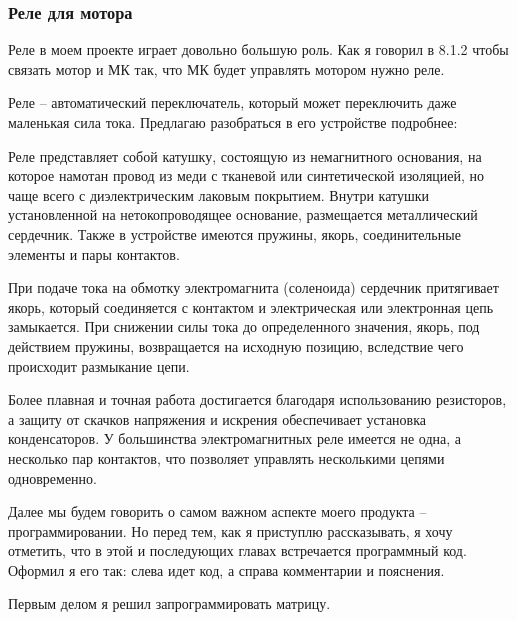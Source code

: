 \documentclass[a4paper, 12pt]{article}
\begin{document}

\subsubsection{Реле для мотора}

Реле в моем проекте играет довольно большую роль. Как я говорил в 8.1.2
чтобы связать мотор и МК так, что МК будет управлять мотором нужно реле.


Реле -- автоматический переключатель, который может переключить даже маленькая
сила тока. Предлагаю разобраться в его устройстве подробнее:


Реле представляет собой катушку, состоящую из немагнитного основания, на 
которое намотан провод из меди с тканевой или синтетической изоляцией, но чаще
всего с диэлектрическим лаковым покрытием. Внутри катушки установленной на 
нетокопроводящее основание, размещается металлический сердечник. Также в 
устройстве имеются пружины, якорь, соединительные элементы и пары контактов.
 
При подаче тока на обмотку электромагнита (соленоида) сердечник притягивает 
якорь, который соединяется с контактом и электрическая или электронная цепь 
замыкается. При снижении силы тока до определенного значения, якорь, под 
действием пружины, возвращается на исходную позицию, вследствие чего 
происходит размыкание цепи.

Более плавная и точная работа достигается благодаря использованию резисторов,
а защиту от скачков напряжения и искрения обеспечивает установка конденсаторов.
У большинства электромагнитных реле имеется не одна, а несколько пар 
контактов, что позволяет управлять несколькими цепями одновременно.

Далее мы будем говорить о самом важном аспекте моего продукта -- 
программировании. Но перед тем, как я приступлю рассказывать, я хочу отметить,
что в этой и последующих главах встречается программный код. Оформил я его так:
слева идет код, а справа комментарии и пояснения.

Первым делом я решил запрограммировать матрицу.\newpage
\end{document}
